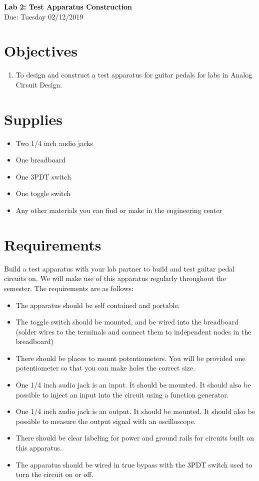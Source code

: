 \documentclass[12pt,letterpaper,onecolumn]{report}
\begin{document}
\begin{center}
\LARGE{\textbf{Lab 2: Test Apparatus Construction}}\\
\Large{Due: Tuesday 02/12/2019}
\\

\end{center}

\section*{Objectives}
\begin{enumerate}
\item To design and construct a test apparatus for guitar pedals for labs in Analog Circuit Design.

\end{enumerate}

\section*{Supplies}
\begin{itemize}
\item Two 1/4 inch audio jacks
\item One breadboard
\item One 3PDT switch
\item One toggle switch
\item Any other materials you can find or make in the engineering center
\end{itemize}

\section*{Requirements}
Build a test apparatus with your lab partner to build and test guitar pedal circuits on.  We will make use of this apparatus regularly throughout the semester.  The requirements are as follows:
\begin{itemize}
\item The apparatus should be self contained and portable.
\item The toggle switch should be mounted, and be wired into the breadboard (solder wires to the terminals and connect them to independent nodes in the breadboard)
\item There should be places to mount potentiometers.  You will be provided one potentiometer so that you can make holes the correct size.
\item  One 1/4 inch audio jack is an input.  It should be mounted.  It should also be possible to inject an input into the circuit using a function generator.
\item One 1/4 inch audio jack is an output.  It should be mounted.  It should also be possible to measure the output signal with an oscilloscope.
\item There should be clear labeling for power and ground rails for circuits built on this apparatus.
\item The apparatus should be wired in true bypass with the 3PDT switch used to turn the circuit on or off.
\end{itemize}
\end{document}
